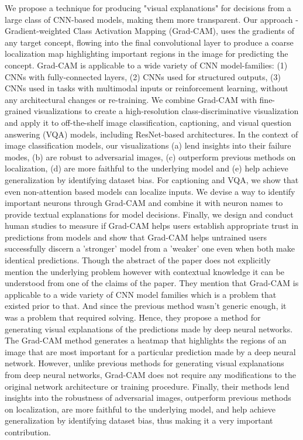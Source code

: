\documentclass[11pt]{article}
\begin{document}
We propose a technique for producing "visual explanations" for decisions from a large class of CNN-based models, making them more transparent. Our approach - Gradient-weighted Class Activation Mapping (Grad-CAM), uses the gradients of any target concept, flowing into the final convolutional layer to produce a coarse localization map highlighting important regions in the image for predicting the concept. Grad-CAM is applicable to a wide variety of CNN model-families: (1) CNNs with fully-connected layers, (2) CNNs used for structured outputs, (3) CNNs used in tasks with multimodal inputs or reinforcement learning, without any architectural changes or re-training. We combine Grad-CAM with fine-grained visualizations to create a high-resolution class-discriminative visualization and apply it to off-the-shelf image classification, captioning, and visual question answering (VQA) models, including ResNet-based architectures. In the context of image classification models, our visualizations (a) lend insights into their failure modes, (b) are robust to adversarial images, (c) outperform previous methods on localization, (d) are more faithful to the underlying model and (e) help achieve generalization by identifying dataset bias. For captioning and VQA, we show that even non-attention based models can localize inputs. We devise a way to identify important neurons through Grad-CAM and combine it with neuron names to provide textual explanations for model decisions. Finally, we design and conduct human studies to measure if Grad-CAM helps users establish appropriate trust in predictions from models and show that Grad-CAM helps untrained users successfully discern a 'stronger' model from a 'weaker' one even when both make identical predictions. \newline 
Though the abstract of the paper does not explicitly mention the underlying problem however with contextual knowledge it can be understood from one of the claims of the paper. They mention that Grad-CAM is applicable to a wide variety of CNN model families which is a problem that existed prior to that. And since the previous method wasn't generic enough, it was a problem that required solving. Hence, they propose a method for generating visual explanations of the predictions made by deep neural networks. The Grad-CAM method generates a heatmap that highlights the regions of an image that are most important for a particular prediction made by a deep neural network. However, unlike previous methods for generating visual explanations from deep neural networks, Grad-CAM does not require any modifications to the original network architecture or training procedure. Finally, their methods lend insights into the robustness of adversarial images, outperform previous methods on localization, are more faithful to the underlying model, and help achieve generalization by identifying dataset bias, thus making it a very important contribution. \newline 
\end{document}
